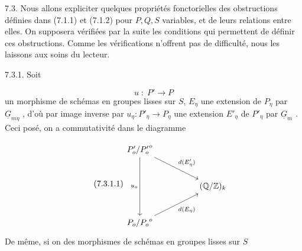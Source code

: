 7.3. Nous allons expliciter quelques propriétés fonctorielles des obstructions définies dans (7.1.1) et (7.1.2) pour $P,Q,S$ variables, et de leurs relations entre elles. On supposera vérifiées par la suite les conditions qui permettent de définir ces obstructions. Comme les vérifications n'offrent pas de difficulté, nous les laissons aux soins du lecteur.

7.3.1. Soit

\begin{equation*}
u \; : \; P' \longrightarrow P
\end{equation*}
un morphisme de schémas en groupes lisses sur $S$, $E_\eta$ une extension de $P_\eta$ par $\underline{G}_{m\eta}$ , d'où par image inverse par $u_\eta : P'_\eta \longrightarrow P_\eta$ une extension $E'_\eta$ de $P'_\eta$ par $\underline{G}_m$ . Ceci posé, on a commutativité dans le diagramme 



\begin{equation}\tag{7.3.1.1}
\begin{tikzcd}[row sep=large, column sep=huge]
{P'_o/{P'_o}^{o}} \arrow[dd, "u_o"'] \arrow[rd, "d(E'_\eta)"] & \\
 & {(\mathbb{Q}/\mathbb{Z})_k} \\
{P_o/{P_o}^{o}} \arrow[ru, "d(E_\eta)"'] &
\end{tikzcd}
\end{equation}
De même, si on des morphismes de schémas en groupes lisses sur $S$

